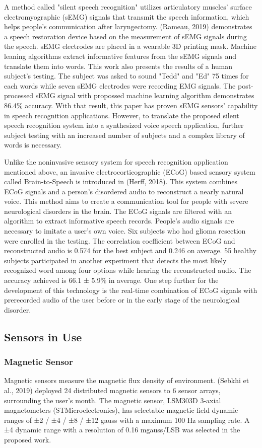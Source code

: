 A method called "silent speech recognition" utilizes articulatory muscles' surface electromyographic (sEMG) signals that transmit the speech information, which helps people's communication after laryngectomy. (Rameau, 2019) demonstrates a speech restoration device based on the measurement of sEMG signals during the speech. sEMG electrodes are placed in a wearable 3D printing mask. Machine leaning algorithms extract informative features from the sEMG signals and translate them into words. This work also presents the results of a human subject's testing. The subject was asked to sound "Tedd" and "Ed" 75 times for each words while seven sEMG electrodes were recording EMG signals. The post-processed sEMG signal with propossed machine learning algorithm demonstrates 86.4\% accuracy. With that result, this paper has proven sEMG sensors' capability in speech recognition applications. However, to translate the proposed silent speech recognition system into a synthesized voice speech application, further subject testing with an increased number of subjects and a complex library of words is necessary.

Unlike the noninvasive sensory system for speech recognition application mentioned above, an invasive electrocorticographic (ECoG) based sensory system called Brain-to-Speech is introduced in (Herff, 2018). This system combines ECoG signals and a person's disordered audio to reconstruct a nearly natural voice. This method aims to create a communication tool for people with severe neurological disorders in the brain. The ECoG signals are filtered with an algorithm to extract informative speech records. People's audio signals are necessary to imitate a user's own voice. Six subjects who had glioma resection were enrolled in the testing. The correlation coefficient between ECoG and reconstructed audio is 0.574 for the best subject and 0.246 on average. 55 healthy subjects participated in another experiment that detects the most likely recognized word among four options while hearing the reconstructed audio. The accuracy achieved is 66.1 ± 5.9\% in average. One step further for the development of this technology is the real-time combination of ECoG signals with prerecorded audio of the user before or in the early stage of the neurological disorder. 

\subsection{Sensors in Use}
\subsubsection{Magnetic Sensor}
Magnetic sensors measure the magnetic flux density of environment. (Sebkhi et al., 2019) deployed 24 distributed magnetic sensors to 6 sensor arrays, surrounding the user's month. The magnetic sensor, LSM303D 3-axial magnetometers (STMicroelectronics), has selectable magnetic field dynamic ranges of ±2 / ±4 / ±8 / ±12 gauss with a maximum 100 Hz sampling rate. A ±4 dynamic range with a resolution of 0.16 mgauss/LSB was selected in the proposed work.

